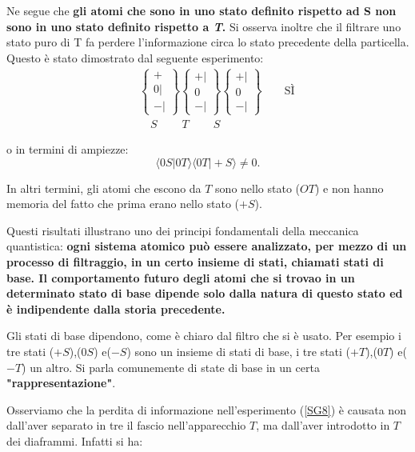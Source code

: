 Ne segue che \textbf{gli atomi che sono in uno stato definito rispetto ad S non sono in uno stato definito rispetto a \emph{T}.}
Si osserva inoltre che il filtrare uno stato puro di T fa perdere l'informazione circa lo stato precedente della particella. Questo è stato dimostrato dal seguente esperimento:
\begin{eqnarray}
& &\begin{Bmatrix}
 + \\ 0 | \\ - |  
\end{Bmatrix}
\begin{Bmatrix}
 + | \\ 0  \\ - |  
\end{Bmatrix}
\begin{Bmatrix}
 + | \\ 0  \\ - |  
\end{Bmatrix} \qquad \text{SÌ} \\
& & \quad S  \ \qquad T\ \qquad S \nonumber
\label{SG8}
\end{eqnarray}

o in termini di ampiezze:
\begin{equation}
\langle 0S | 0T \rangle \langle 0T | +S \rangle \neq 0 .
\end{equation}

In altri termini, gli atomi che escono da $T$ sono nello stato ($OT$) e non hanno memoria del fatto che prima erano nello stato ($+S$).

Questi risultati illustrano uno dei principi fondamentali della meccanica quantistica: \textbf{ogni sistema atomico può essere analizzato, per mezzo di un processo di filtraggio, in un certo insieme di stati, chiamati stati di base. Il comportamento futuro degli atomi che si trovao in un determinato stato di base dipende solo dalla natura di questo stato ed è indipendente dalla storia precedente.}

Gli stati di base dipendono, come è chiaro dal filtro che si è usato. Per esempio i tre stati ($+S$),($0S$) e($-S$) sono un insieme di stati di base, i tre stati ($+T$),($0T$) e($-T$) un altro. Si parla comunemente di state di base in un certa \textbf{"rappresentazione"}.

Osserviamo che la perdita di informazione nell'esperimento (\ref{SG8}) è causata non dall'aver separato in tre il fascio nell'apparecchio $T$, ma dall'aver introdotto in $T$ dei diaframmi. Infatti si ha:

